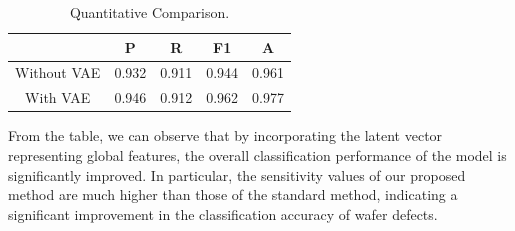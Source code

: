 \documentclass[conference]{IEEEtran}
\begin{document}
\begin{table}[!t]
    \centering
    \setlength{\tabcolsep}{1.5mm}
    \caption{Quantitative Comparison.}
    \label{tab:1}
    \begin{tabular}{ccccc}
        \hline
                    & P     & R     & F1    & A     \\ 
        \hline
        Without VAE & 0.932 & 0.911 & 0.944 & 0.961 \\ 
        \hline
        With VAE    & 0.946 & 0.912 & 0.962 & 0.977 \\ 
        \hline
    \end{tabular}
\end{table}



From the table, we can observe that by incorporating the latent vector representing global features, the overall classification performance of the model is significantly improved. In particular, the sensitivity values of our proposed method are much higher than those of the standard method, indicating a significant improvement in the classification accuracy of wafer defects.
%
% 
%
\end{document}
